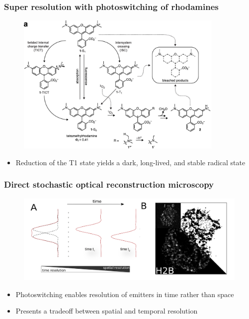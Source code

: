 \documentclass{beamer}					%
\begin{document}
\begin{frame}
\frametitle{Super resolution with photoswitching of rhodamines}

\begin{figure}
\includegraphics[width=10cm]{Rhodamines.png}
\end{figure}
\begin{itemize}
\item  Reduction of the T1 state yields a dark, long-lived, and stable radical state
\end{itemize}
\end{frame}



\begin{frame}
\frametitle{Direct stochastic optical reconstruction microscopy}

\begin{figure}
\includegraphics[width=13cm]{Concept.png}
\end{figure}

\begin{itemize}
\item Photoswitching enables resolution of emitters in time rather than space
\item Presents a tradeoff between spatial and temporal resolution
\end{itemize}

\end{frame}
\end{document}
